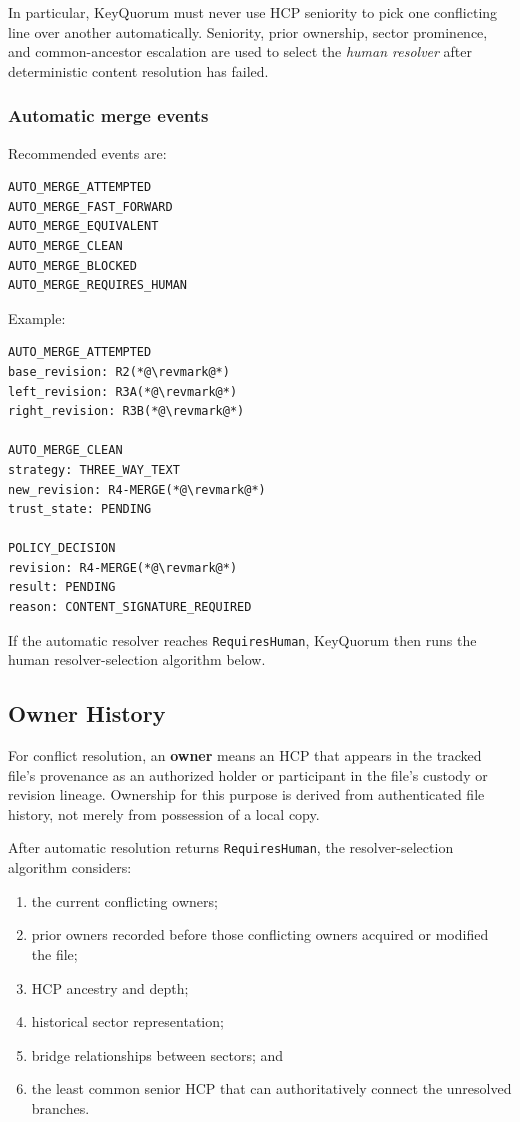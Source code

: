 \documentclass[11pt]{article}
\begin{document}
In particular, KeyQuorum must never use HCP seniority to pick one conflicting line over another automatically. Seniority, prior ownership, sector prominence, and common-ancestor escalation are used to select the \emph{human resolver} after deterministic content resolution has failed.

\subsubsection*{Automatic merge events}

Recommended events are:

\begin{lstlisting}
AUTO_MERGE_ATTEMPTED
AUTO_MERGE_FAST_FORWARD
AUTO_MERGE_EQUIVALENT
AUTO_MERGE_CLEAN
AUTO_MERGE_BLOCKED
AUTO_MERGE_REQUIRES_HUMAN
\end{lstlisting}

Example:

\begin{lstlisting}
AUTO_MERGE_ATTEMPTED
base_revision: R2(*@\revmark@*)
left_revision: R3A(*@\revmark@*)
right_revision: R3B(*@\revmark@*)

AUTO_MERGE_CLEAN
strategy: THREE_WAY_TEXT
new_revision: R4-MERGE(*@\revmark@*)
trust_state: PENDING

POLICY_DECISION
revision: R4-MERGE(*@\revmark@*)
result: PENDING
reason: CONTENT_SIGNATURE_REQUIRED
\end{lstlisting}

If the automatic resolver reaches \texttt{RequiresHuman}, KeyQuorum then runs the human resolver-selection algorithm below.


\subsection{Owner History}

For conflict resolution, an \textbf{owner} means an HCP that appears in the tracked file's provenance as an authorized holder or participant in the file's custody or revision lineage. Ownership for this purpose is derived from authenticated file history, not merely from possession of a local copy.

After automatic resolution returns \texttt{RequiresHuman}, the resolver-selection algorithm considers:
\begin{enumerate}[leftmargin=1.8em]
  \item the current conflicting owners;
  \item prior owners recorded before those conflicting owners acquired or modified the file;
  \item HCP ancestry and depth;
  \item historical sector representation;
  \item bridge relationships between sectors; and
  \item the least common senior HCP that can authoritatively connect the unresolved branches.
\end{enumerate}
\end{document}
